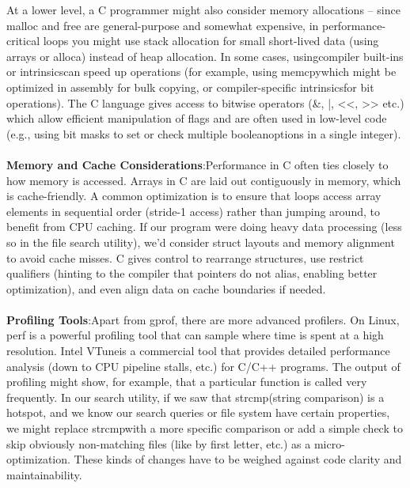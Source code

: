 \documentclass{article}
\begin{document}
{\normalsize At a lower level, a C programmer might also c}{\normalsize onsider memory allocations – since malloc and free are general-purpose and somewhat expensive, in performance-critical loops you might use stack allocation for small short-lived data (using arrays or }{\normalsize alloca}{\normalsize ) instead of heap allocation. In some cases, using}{\normalsize  compiler built-ins or }{\normalsize intrinsics}{\normalsize  can speed up operations (for example, using }{\normalsize memcpy}{\normalsize  which might be optimized in assembly for bulk copying, or compiler-specific }{\normalsize intrinsics}{\normalsize  for bit operations). The C language gives access to bitwise operators (\&, |, <<, >> }{\normalsize etc.) which allow efficient manipulation of flags and are often used in low-level code (e.g., using bit masks to set or check multiple }{\normalsize boolean}{\normalsize  options in a single integer).}\\
\\
{\normalsize \textbf{Memory and Cache Considerations}}{\normalsize :}{\normalsize  Performance in C often ties closely to how memor}{\normalsize y is accessed. Arrays in C are laid out contiguously in memory, which is cache-friendly. A common optimization is to ensure that loops access array elements in sequential order (stride-1 access) rather than jumping around, to benefit from CPU caching. If o}{\normalsize ur program were doing heavy data processing (less so in the file search utility), we'd consider struct layouts and memory alignment to avoid cache misses. C gives control to rearrange structures, use restrict qualifiers (hinting to the compiler that pointe}{\normalsize rs do not alias, enabling better optimization), and even align data on cache boundaries if needed.}\\
\\
{\normalsize \textbf{Profiling Tools}}:{\normalsize  Apart from }{\normalsize gprof}{\normalsize , there are more advanced profilers. On Linux, perf is a powerful profiling tool that can sample where time is spent at a }{\normalsize high resolution. Intel }{\normalsize VTune}{\normalsize  is a commercial tool that provides detailed performance analysis (down to CPU pipeline stalls, etc.) for C/C++ programs. The output of profiling might show, for example, that a particular function is called very frequently. In }{\normalsize our search utility, if we saw that }{\normalsize strcmp}{\normalsize  (string comparison) is a hotspot, and we know our search queries or file system have certain properties, we might replace }{\normalsize strcmp}{\normalsize  with a more specific comparison or add a simple check to skip obviously non-matching }{\normalsize files (like by first letter, etc.) as a micro-optimization. These kinds of changes have to be weighed against code clarity and maintainability.}\\
\end{document}
